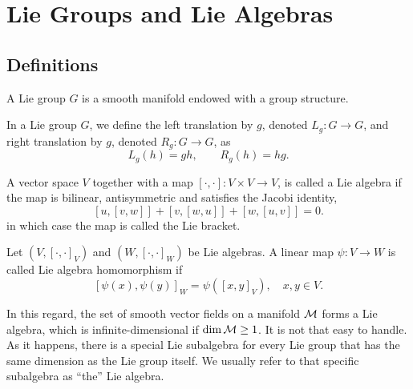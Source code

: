 \documentclass[../main.tex]{subfiles}
\begin{document}
\section{Lie Groups and Lie Algebras}
\subsection{Definitions}
\begin{definition}\label{def:Lie-Groups}
    A Lie group \(G\) is a smooth manifold endowed with a group structure.
\end{definition}
\begin{definition}[Translation]\label{def:Translation}
    In a Lie group \(G\), we define the left translation by \(g\), denoted \(L_g : G \to G\), and right translation by \(g\), denoted \(R_g : G \to G\), as
    \[
    L_g(h) = gh, \qquad R_g(h) = hg.
    \]
\end{definition}
\begin{definition}\label{def:Lie-Algebra}
    A vector space \(V\) together with a map \([\cdot, \cdot ] : V \times V \to V\), is called a Lie algebra if the map is bilinear, antisymmetric and satisfies the Jacobi identity,
    \[
        [u, [v, w]] + [v, [w, u]] + [w,[u,v]] = 0.
    \]
in which case the map is called the Lie bracket.
\end{definition}
\begin{definition}\label{def:Lie-Algebra-Homomorphism}
    Let \((V, [\cdot ,\cdot ]_V)\) and \((W, [\cdot ,\cdot ]_W)\) be Lie algebras. A linear map \(\psi : V \to W\) is called Lie algebra homomorphism if
    \[
        [\psi(x), \psi(y)]_W = \psi\left( [x, y]_V \right), \quad x, y \in V.
    \]
\end{definition}
\begin{remark}
    In this regard, the set of smooth vector fields on a manifold \(\manifold[M]\) forms a Lie algebra, which is infinite-dimensional if \(\dim \manifold[M] \ge 1\). It is not that easy to handle.\\
    As it happens, there is a special Lie subalgebra for every Lie group that has the same dimension as the Lie group itself. We usually refer to that specific subalgebra as ``the'' Lie algebra.
\end{remark}
\end{document}

